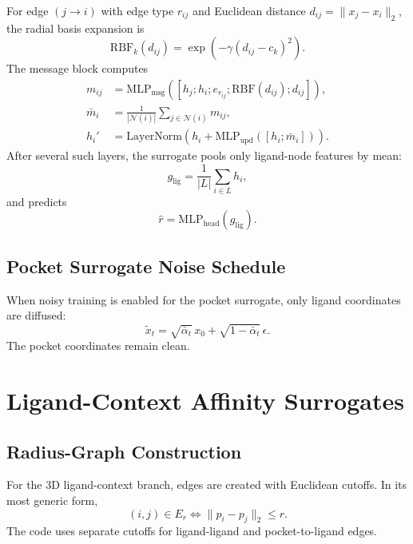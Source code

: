 \documentclass[11pt]{article}
\begin{document}
For edge $(j \to i)$ with edge type $r_{ij}$ and Euclidean distance $d_{ij} = \|x_j - x_i\|_2$, the radial basis expansion is
\begin{equation}
\mathrm{RBF}_k(d_{ij})
=
\exp\!\left(
-\gamma (d_{ij} - c_k)^2
\right).
\end{equation}
The message block computes
\begin{align}
m_{ij}
&=
\mathrm{MLP}_{\mathrm{msg}}
\left(
[h_j ; h_i ; e_{r_{ij}} ; \mathrm{RBF}(d_{ij}) ; d_{ij}]
\right), \\
\bar{m}_i
&=
\frac{1}{|\mathcal{N}(i)|}
\sum_{j \in \mathcal{N}(i)} m_{ij}, \\
h_i'
&=
\mathrm{LayerNorm}
\left(
h_i + \mathrm{MLP}_{\mathrm{upd}}([h_i ; \bar{m}_i])
\right).
\end{align}
After several such layers, the surrogate pools only ligand-node features by mean:
\begin{equation}
g_{\mathrm{lig}}
=
\frac{1}{|L|}
\sum_{i \in L} h_i,
\end{equation}
and predicts
\begin{equation}
\hat{r} = \mathrm{MLP}_{\mathrm{head}}(g_{\mathrm{lig}}).
\end{equation}

\subsection{Pocket Surrogate Noise Schedule}
When noisy training is enabled for the pocket surrogate, only ligand coordinates are diffused:
\begin{equation}
\tilde{x}_t
=
\sqrt{\bar{\alpha}_t}\,x_0
+
\sqrt{1-\bar{\alpha}_t}\,\epsilon.
\end{equation}
The pocket coordinates remain clean.

\section{Ligand-Context Affinity Surrogates}
\subsection{Radius-Graph Construction}
For the 3D ligand-context branch, edges are created with Euclidean cutoffs. In its most generic form,
\begin{equation}
(i,j) \in E_r
\iff
\|p_i - p_j\|_2 \le r.
\end{equation}
The code uses separate cutoffs for ligand-ligand and pocket-to-ligand edges.
\end{document}
